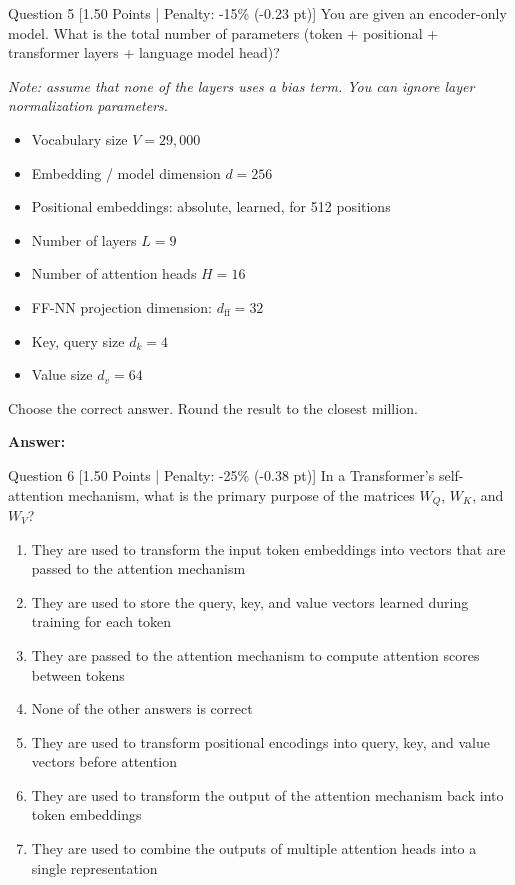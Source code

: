 \documentclass[11pt,a4paper]{article}
\begin{document}
\begin{questionbox}{Question 5 \hfill [1.50 Points | Penalty: -15\% (-0.23 pt)]}
You are given an encoder-only model. What is the total number of parameters (token + positional + transformer layers + language model head)?

\noindent\textit{Note: assume that none of the layers uses a bias term. You can ignore layer normalization parameters.}
\begin{itemize}[noitemsep]
    \item Vocabulary size $V = 29{,}000$
    \item Embedding / model dimension $d = 256$
    \item Positional embeddings: absolute, learned, for 512 positions
    \item Number of layers $L = 9$
    \item Number of attention heads $H = 16$
    \item FF-NN projection dimension: $d_{\text{ff}} = 32$
    \item Key, query size $d_k = 4$
    \item Value size $d_v = 64$
\end{itemize}

\noindent Choose the correct answer. Round the result to the closest million.

\vspace{0.2cm}
\noindent\textbf{Answer:} \underline{\hspace{4cm}}
\end{questionbox}

\vspace{0.3cm}

\begin{questionbox}{Question 6 \hfill [1.50 Points | Penalty: -25\% (-0.38 pt)]}
In a Transformer's self-attention mechanism, what is the primary purpose of the matrices $W_Q$, $W_K$, and $W_V$?

\begin{enumerate}[label=\alph*.,itemsep=2pt]
    \item They are used to transform the input token embeddings into vectors that are passed to the attention mechanism
    \item They are used to store the query, key, and value vectors learned during training for each token
    \item They are passed to the attention mechanism to compute attention scores between tokens
    \item None of the other answers is correct
    \item They are used to transform positional encodings into query, key, and value vectors before attention
    \item They are used to transform the output of the attention mechanism back into token embeddings
    \item They are used to combine the outputs of multiple attention heads into a single representation
\end{enumerate}
\end{questionbox}
\end{document}
